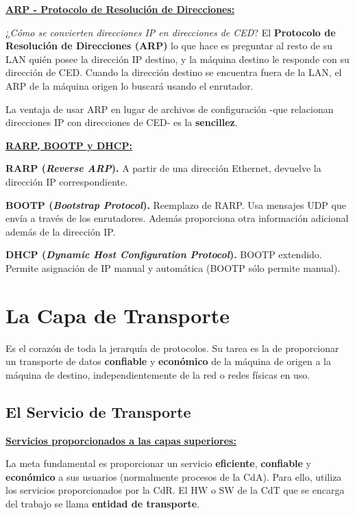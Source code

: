 \documentclass[10pt,a4paper]{article}
\begin{document}
\underline{\textbf{ARP - Protocolo de Resolución de Direcciones:}}

¿\textit{Cómo se convierten direcciones IP en direcciones de CED}? El \textbf{Protocolo de Resolución de Direcciones (ARP)} lo que hace es preguntar al resto de su LAN quién posee la dirección IP destino, y la máquina destino le responde con su dirección de CED. Cuando la dirección destino se encuentra fuera de la LAN, el ARP de la máquina origen lo buscará usando el enrutador.

La ventaja de usar ARP en lugar de archivos de configuración -que relacionan direcciones IP con direcciones de CED- es la \textbf{sencillez}.

\underline{\textbf{RARP, BOOTP y DHCP:}}

\begin{description}
\item \textbf{RARP (\textit{Reverse ARP}).} A partir de una dirección Ethernet, devuelve la dirección IP correspondiente.
\item \textbf{BOOTP (\textit{Bootstrap Protocol}).} Reemplazo de RARP. Usa mensajes UDP que envía a través de los enrutadores. Además proporciona otra información adicional además de la dirección IP.
\item \textbf{DHCP (\textit{Dynamic Host Configuration Protocol}).} BOOTP extendido. Permite asignación de IP manual y automática (BOOTP sólo permite manual).
\end{description}

\section{La Capa de Transporte}

Es el corazón de toda la jerarquía de protocolos. Su tarea es la de proporcionar un transporte de datos \textbf{confiable} y \textbf{económico} de la máquina de origen a la máquina de destino, independientemente de la red o redes físicas en uso.

\subsection{El Servicio de Transporte}

\underline{\textbf{Servicios proporcionados a las capas superiores:}}

La meta fundamental es proporcionar un servicio \textbf{eficiente}, \textbf{confiable} y \textbf{económico} a sus usuarios (normalmente procesos de la CdA). Para ello, utiliza los servicios proporcionados por la CdR. El HW o SW de la CdT que se encarga del trabajo se llama \textbf{entidad de transporte}.
\end{document}

